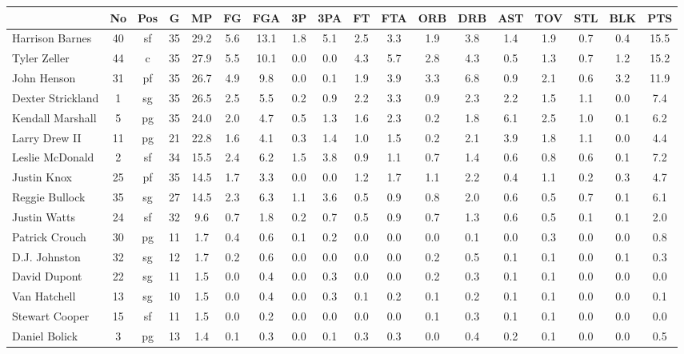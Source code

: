 \documentclass[10pt,letterpaper]{article}
\begin{document}
\begin{table}[ht]
\begin{center}
\begin{tabular}{lccccccccccccccccc}
  \hline
 & No & Pos & G & MP & FG & FGA & 3P & 3PA & FT & FTA & ORB & DRB & AST & TOV & STL & BLK & PTS \\ 
  \hline
Harrison Barnes & 40 & sf & 35 & 29.2 & 5.6 & 13.1 & 1.8 & 5.1 & 2.5 & 3.3 & 1.9 & 3.8 & 1.4 & 1.9 & 0.7 & 0.4 & 15.5 \\ 
  Tyler Zeller & 44 & c & 35 & 27.9 & 5.5 & 10.1 & 0.0 & 0.0 & 4.3 & 5.7 & 2.8 & 4.3 & 0.5 & 1.3 & 0.7 & 1.2 & 15.2 \\ 
  John Henson & 31 & pf & 35 & 26.7 & 4.9 & 9.8 & 0.0 & 0.1 & 1.9 & 3.9 & 3.3 & 6.8 & 0.9 & 2.1 & 0.6 & 3.2 & 11.9 \\ 
  Dexter Strickland & 1 & sg & 35 & 26.5 & 2.5 & 5.5 & 0.2 & 0.9 & 2.2 & 3.3 & 0.9 & 2.3 & 2.2 & 1.5 & 1.1 & 0.0 & 7.4 \\ 
  Kendall Marshall & 5 & pg & 35 & 24.0 & 2.0 & 4.7 & 0.5 & 1.3 & 1.6 & 2.3 & 0.2 & 1.8 & 6.1 & 2.5 & 1.0 & 0.1 & 6.2 \\ 
  Larry Drew II & 11 & pg & 21 & 22.8 & 1.6 & 4.1 & 0.3 & 1.4 & 1.0 & 1.5 & 0.2 & 2.1 & 3.9 & 1.8 & 1.1 & 0.0 & 4.4 \\ 
  Leslie McDonald & 2 & sf & 34 & 15.5 & 2.4 & 6.2 & 1.5 & 3.8 & 0.9 & 1.1 & 0.7 & 1.4 & 0.6 & 0.8 & 0.6 & 0.1 & 7.2 \\ 
  Justin Knox & 25 & pf & 35 & 14.5 & 1.7 & 3.3 & 0.0 & 0.0 & 1.2 & 1.7 & 1.1 & 2.2 & 0.4 & 1.1 & 0.2 & 0.3 & 4.7 \\ 
  Reggie Bullock & 35 & sg & 27 & 14.5 & 2.3 & 6.3 & 1.1 & 3.6 & 0.5 & 0.9 & 0.8 & 2.0 & 0.6 & 0.5 & 0.7 & 0.1 & 6.1 \\ 
  Justin Watts & 24 & sf & 32 & 9.6 & 0.7 & 1.8 & 0.2 & 0.7 & 0.5 & 0.9 & 0.7 & 1.3 & 0.6 & 0.5 & 0.1 & 0.1 & 2.0 \\ 
  Patrick Crouch & 30 & pg & 11 & 1.7 & 0.4 & 0.6 & 0.1 & 0.2 & 0.0 & 0.0 & 0.0 & 0.1 & 0.0 & 0.3 & 0.0 & 0.0 & 0.8 \\ 
  D.J. Johnston & 32 & sg & 12 & 1.7 & 0.2 & 0.6 & 0.0 & 0.0 & 0.0 & 0.0 & 0.2 & 0.5 & 0.1 & 0.1 & 0.0 & 0.1 & 0.3 \\ 
  David Dupont & 22 & sg & 11 & 1.5 & 0.0 & 0.4 & 0.0 & 0.3 & 0.0 & 0.0 & 0.2 & 0.3 & 0.1 & 0.1 & 0.0 & 0.0 & 0.0 \\ 
  Van Hatchell & 13 & sg & 10 & 1.5 & 0.0 & 0.4 & 0.0 & 0.3 & 0.1 & 0.2 & 0.1 & 0.2 & 0.1 & 0.1 & 0.0 & 0.0 & 0.1 \\ 
  Stewart Cooper & 15 & sf & 11 & 1.5 & 0.0 & 0.2 & 0.0 & 0.0 & 0.0 & 0.0 & 0.1 & 0.3 & 0.1 & 0.1 & 0.0 & 0.0 & 0.0 \\ 
  Daniel Bolick & 3 & pg & 13 & 1.4 & 0.1 & 0.3 & 0.0 & 0.1 & 0.3 & 0.3 & 0.0 & 0.4 & 0.2 & 0.1 & 0.0 & 0.0 & 0.5 \\ 
   \hline
\end{tabular}
\end{center}
\end{table}
\end{document}
